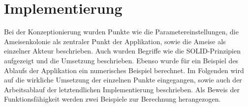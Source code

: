 \chapter{Implementierung}
Bei der Konzeptionierung wurden Punkte wie die Parametereinstellungen, die Ameisenkolonie als zentraler Punkt der Applikation, sowie die Ameise als einzelner Akteur beschrieben. Auch wurden Begriffe wie die SOLID-Prinzipien aufgezeigt und die Umsetzung beschrieben. Ebenso wurde für ein Beispiel des Ablaufs der Applikation ein numerisches Beispiel berechnet. Im Folgenden wird auf die wirkliche Umsetzung der einzelnen Punkte eingegangen, sowie auch der Arbeitsablauf der letztendlichen Implementierung beschrieben. Als Beweis der Funktionsfähigkeit werden zwei Beispiele zur Berechnung herangezogen.







%


%
%
%